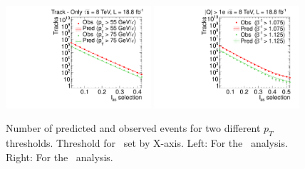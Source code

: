\begin{figure}
\centering
  \includegraphics[clip=false, trim=0.0cm 0cm 0.0cm 0cm, width=0.48\textwidth]{figures/tkonly/Prediction_Data8TeV_NPredVsNObs}
  \includegraphics[clip=false, trim=0.0cm 0cm 0.0cm 0cm, width=0.48\textwidth]{figures/multi/Prediction_Data8TeV_NPredVsNObs}
  \caption[Number of predicted and observed events for two different thresholds in the \tkonly\ and \multi\ analyses.]
{Number of predicted and observed events for two different $p_T$ thresholds. Threshold for \ias\ set by X-axis.
Left: For the \tkonly\ analysis. Right: For the \multi\ analysis.}
    \label{fig:PredMF}
\end{figure}

